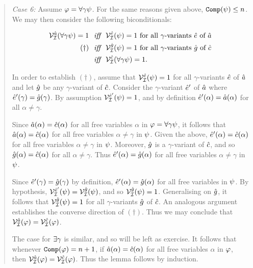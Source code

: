 \begin{quote}
  \textit{Case 6:} Assume $\varphi=\forall \gamma\psi$.
  For the same reasons given above, $\texttt{Comp}(\psi)\leq n$.
  We may then consider the following biconditionals:

  \vspace{-.2in}
  \begin{align*}
    \mathcal{V}_{\mathcal{I}}^{\hat{a}}(\forall \gamma\psi)=1 &\textit{ ~iff~ } \mathcal{V}_{\mathcal{I}}^{\hat{e}}(\psi)=1 \text{ for all } \gamma\text{-variants } \hat{e} \text{ of } \hat{a}\\ 
      (\dagger) &\textit{ ~iff~ } \mathcal{V}_{\mathcal{I}}^{\hat{g}}(\psi)=1 \text{ for all } \gamma\text{-variants } \hat{g} \text{ of } \hat{c}\\  
      &\textit{ ~iff~ } \mathcal{V}_{\mathcal{I}}^{\hat{c}}(\forall \gamma\psi)=1.
  \end{align*}

  In order to establish $(\dagger)$, assume that $\mathcal{V}_{\mathcal{I}}^{\hat{e}}(\psi)=1$ for all $\gamma$-variants $\hat{e}$ of $\hat{a}$ and let $\hat{g}$ be any $\gamma$-variant of $\hat{c}$.
  Consider the $\gamma$-variant $\hat{e}'$ of $\hat{a}$ where $\hat{e}'(\gamma)=\hat{g}(\gamma)$.
  By assumption $\mathcal{V}_{\mathcal{I}}^{\hat{e}'}(\psi)=1$, and by definition $\hat{e}'(\alpha)=\hat{a}(\alpha)$ for all $\alpha\neq\gamma$.

  Since $\hat{a}(\alpha)=\hat{c}(\alpha)$ for all free variables $\alpha$ in $\varphi=\forall \gamma\psi$, it follows that $\hat{a}(\alpha)=\hat{c}(\alpha)$ for all free variables $\alpha\neq\gamma$ in $\psi$.
  Given the above, $\hat{e}'(\alpha)=\hat{c}(\alpha)$ for all free variables $\alpha\neq\gamma$ in $\psi$. 
  Moreover, $\hat{g}$ is a $\gamma$-variant of $\hat{c}$, and so $\hat{g}(\alpha)=\hat{c}(\alpha)$ for all $\alpha\neq\gamma$.
  Thus $\hat{e}'(\alpha)=\hat{g}(\alpha)$ for all free variables $\alpha\neq\gamma$ in $\psi$. 

  Since $\hat{e}'(\gamma)=\hat{g}(\gamma)$ by definition, $\hat{e}'(\alpha)=\hat{g}(\alpha)$ for all free variables in $\psi$.  
  By hypothesis, $\mathcal{V}_{\mathcal{I}}^{\hat{e}'}(\psi)=\mathcal{V}_{\mathcal{I}}^{\hat{g}}(\psi)$, and so $\mathcal{V}_{\mathcal{I}}^{\hat{g}}(\psi)=1$.
  Generalising on $\hat{g}$, it follows that $\mathcal{V}_{\mathcal{I}}^{\hat{g}}(\psi)=1$ for all $\gamma$-variants $\hat{g}$ of $\hat{c}$.
  An analogous argument establishes the converse direction of $(\dagger)$.
  Thus we may conclude that $\mathcal{V}_{\mathcal{I}}^{\hat{a}}(\varphi)=\mathcal{V}_{\mathcal{I}}^{\hat{c}}(\varphi)$.

  The case for $\exists \gamma$ is similar, and so will be left as exercise.
  It follows that whenever $\texttt{Comp}(\varphi)=n+1$, if $\hat{a}(\alpha)=\hat{c}(\alpha)$ for all free variables $\alpha$ in $\varphi$, then $\mathcal{V}_{\mathcal{I}}^{\hat{a}}(\varphi)=\mathcal{V}_{\mathcal{I}}^{\hat{c}}(\varphi)$.
  Thus the lemma follows by induction.
\end{quote}


